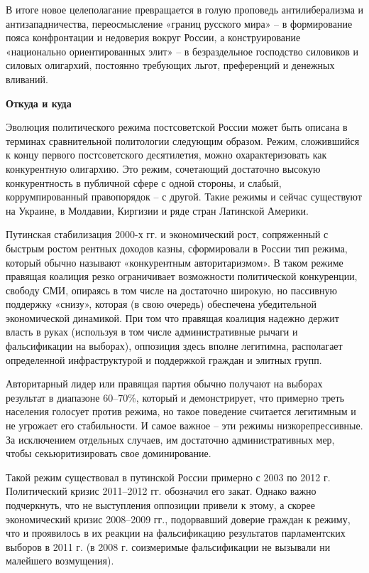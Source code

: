 В итоге новое целеполагание превращается в голую проповедь антилиберализма и антизападничества, переосмысление «границ русского мира» – в формирование пояса конфронтации и недоверия вокруг России, а конструирование «национально ориентированных элит» – в безраздельное господство силовиков и силовых олигархий, постоянно требующих льгот, преференций и денежных вливаний.

\textbf{Откуда и куда}



Эволюция политического режима постсоветской России может быть описана в терминах сравнительной политологии следующим образом. Режим, сложившийся к концу первого постсоветского десятилетия, можно охарактеризовать как конкурентную олигархию. Это режим, сочетающий достаточно высокую конкурентность в публичной сфере с одной стороны, и слабый, коррумпированный правопорядок – с другой. Такие режимы и сейчас существуют на Украине, в Молдавии, Киргизии и ряде стран Латинской Америки.

Путинская стабилизация 2000-х гг. и экономический рост, сопряженный с быстрым ростом рентных доходов казны, сформировали в России тип режима, который обычно называют «конкурентным авторитаризмом». В таком режиме правящая коалиция резко ограничивает возможности политической конкуренции, свободу СМИ, опираясь в том числе на достаточно широкую, но пассивную поддержку «снизу», которая (в свою очередь) обеспечена убедительной экономической динамикой. При том что правящая коалиция надежно держит власть в руках (используя в том числе административные рычаги и фальсификации на выборах), оппозиция здесь вполне легитимна, располагает определенной инфраструктурой и поддержкой граждан и элитных групп.

Авторитарный лидер или правящая партия обычно получают на выборах результат в диапазоне 60–70\%, который и демонстрирует, что примерно треть населения голосует против режима, но такое поведение считается легитимным и не угрожает его стабильности. И самое важное – эти режимы низкорепрессивные. За исключением отдельных случаев, им достаточно административных мер, чтобы секьюритизировать свое доминирование.

Такой режим существовал в путинской России примерно с 2003 по 2012 г. Политический кризис 2011–2012 гг. обозначил его закат. Однако важно подчеркнуть, что не выступления оппозиции привели к этому, а скорее экономический кризис 2008–2009 гг., подорвавший доверие граждан к режиму, что и проявилось в их реакции на фальсификацию результатов парламентских выборов в 2011 г. (в 2008 г. соизмеримые фальсификации не вызывали ни малейшего возмущения).

